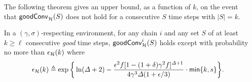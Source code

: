 The following theorem gives an upper bound, as a function of $k$, on the event that $\mathsf{goodConv}_{\mathcal{H}}(S)$ does not hold for a consecutive $S$ time steps with $|S| = k$.

\begin{theorem} \label{thm:honest-convergence-prob}
    In a $(\gamma, \sigma)$-respecting environment, for any chain $i$ and any set $S$ of at least $k \ge \ell$ consecutive \emph{good} time steps, $\mathsf{goodConv}^i_{\mathcal{H}}(S)$ holds except with probability no more than $\epsilon_\mathcal{H}(k)$ where
    \[ \epsilon_\mathcal{H}(k) \triangleq \exp \bigg\{ \ln (\varDelta + 2) - \frac{\epsilon^2 f [1 - (1 + \delta) \gamma^2 f]^{\varDelta + 1}}{4 \gamma^3 \varDelta (1 + \epsilon / 3)} \cdot \mathsf{min} \{k, s \} \bigg\}. \]
\end{theorem}

